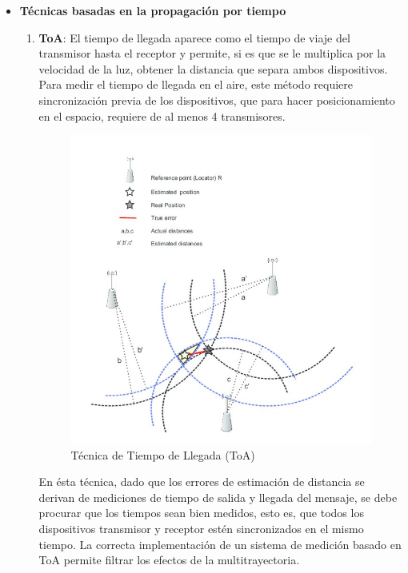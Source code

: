 \begin{itemize}
    \item{\textbf{Técnicas basadas en la propagación por tiempo}
    
    \begin{enumerate}
        \item {\textbf{\ac{ToA}}: \label{ToA} El tiempo de llegada aparece como el tiempo de viaje del transmisor hasta el receptor y permite, si es que se le multiplica por la velocidad de la luz, obtener la distancia que separa ambos dispositivos. Para medir el tiempo de llegada en el aire, este método requiere sincronización previa de los dispositivos, que para hacer posicionamiento en el espacio, requiere de al menos 4 transmisores.\\
        
         \begin{figure}[h!]
            \centering
            \includegraphics[scale=1]{./images/toa}
            \caption{Técnica de Tiempo de Llegada (ToA)}
            \label{fig:ToA}
        \end{figure}
            
        En ésta técnica, dado que los errores de estimación de distancia se derivan de mediciones de tiempo de salida y llegada del mensaje, se debe procurar que los tiempos sean bien medidos, esto es, que todos los dispositivos transmisor y receptor estén sincronizados en el mismo tiempo. La correcta implementación de un sistema de medición basado en ToA permite filtrar los efectos de la multitrayectoria.}\\
        

\end{enumerate}}
\end{itemize}
